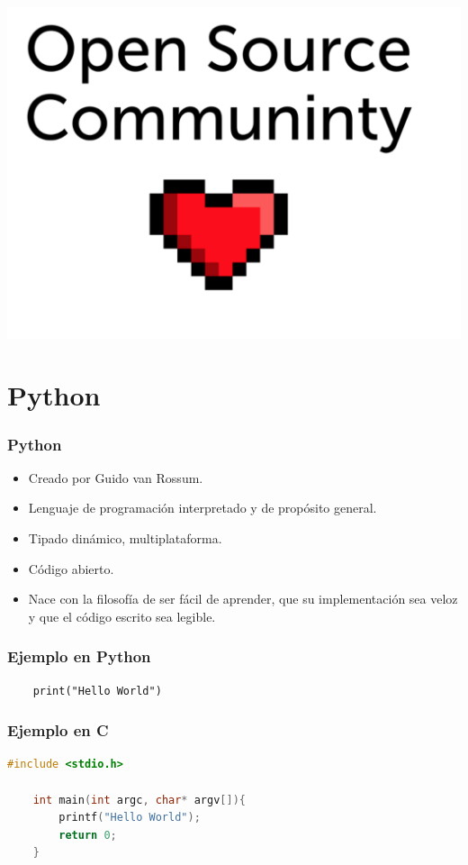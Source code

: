 \documentclass[spanish]{beamer}
\begin{document}
\begin{frame}
	\begin{center}
	\includegraphics[width=1\textwidth]{comunity.png}
	\end{center}
\end{frame}

\section{Python}
\begin{frame}
	\frametitle{Python}
	\begin{itemize}
		\item Creado por Guido van Rossum.
		\item Lenguaje de programación interpretado y de propósito general.
		\item Tipado dinámico, multiplataforma.
		\item Código abierto.
		\item Nace con la filosofía de ser fácil de aprender, que su implementación
			sea veloz y que el código escrito sea legible.
	\end{itemize}
\end{frame}

\begin{frame}[fragile]
	\frametitle{Ejemplo en Python}
	\begin{lstlisting}
	print("Hello World")
	\end{lstlisting}
\end{frame}

\begin{frame}[fragile]
	\frametitle{Ejemplo en C}
	\begin{lstlisting}[language=c]
	#include <stdio.h>

	int main(int argc, char* argv[]){
	    printf("Hello World");
	    return 0;
	}
	\end{lstlisting}

\end{frame}
\end{document}
